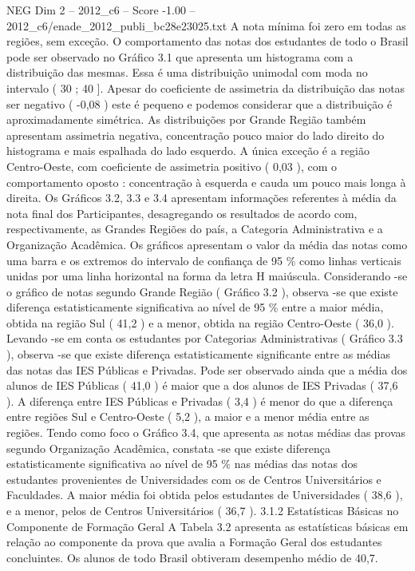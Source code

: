 \begin{textsample}{NEG Dim 2 – 2012\_c6 – Score -1.00 – 2012\_c6/enade\_2012\_publi\_bc28e23025.txt}
A nota mínima foi zero em todas as regiões, sem exceção.
O comportamento das notas dos estudantes de todo o Brasil pode ser observado no Gráfico 3.1 que apresenta um histograma com a distribuição das mesmas.
Essa é uma distribuição unimodal com moda no intervalo ( 30 ; 40 ].
Apesar do coeficiente de assimetria da distribuição das notas ser negativo ( -0,08 ) este é pequeno e podemos considerar que a distribuição é aproximadamente simétrica.
As distribuições por Grande Região também apresentam assimetria negativa, concentração pouco maior do lado direito do histograma e mais espalhada do lado esquerdo.
A única exceção é a região Centro-Oeste, com coeficiente de assimetria positivo ( 0,03 ), com o comportamento oposto : concentração à esquerda e cauda um pouco mais longa à direita.
Os Gráficos 3.2, 3.3 e 3.4 apresentam informações referentes à média da nota final dos Participantes, desagregando os resultados de acordo com, respectivamente, as Grandes Regiões do país, a Categoria Administrativa e a Organização Acadêmica.
Os gráficos apresentam o valor da média das notas como uma barra e os extremos do intervalo de confiança de 95 \% como linhas verticais unidas por uma linha horizontal na forma da letra H maiúscula.
Considerando -se o gráfico de notas segundo Grande Região ( Gráfico 3.2 ), observa -se que existe diferença estatisticamente significativa ao nível de 95 \% entre a maior média, obtida na região Sul ( 41,2 ) e a menor, obtida na região Centro-Oeste ( 36,0 ).
Levando -se em conta os estudantes por Categorias Administrativas ( Gráfico 3.3 ), observa -se que existe diferença estatisticamente significante entre as médias das notas das IES Públicas e Privadas.
Pode ser observado ainda que a média dos alunos de IES Públicas ( 41,0 ) é maior que a dos alunos de IES Privadas ( 37,6 ).
A diferença entre IES Públicas e Privadas ( 3,4 ) é menor do que a diferença entre regiões Sul e Centro-Oeste ( 5,2 ), a maior e a menor média entre as regiões.
Tendo como foco o Gráfico 3.4, que apresenta as notas médias das provas segundo Organização Acadêmica, constata -se que existe diferença estatisticamente significativa ao nível de 95 \% nas médias das notas dos estudantes provenientes de Universidades com os de Centros Universitários e Faculdades.
A maior média foi obtida pelos estudantes de Universidades ( 38,6 ), e a menor, pelos de Centros Universitários ( 36,7 ). 3.1.2 Estatísticas Básicas no Componente de Formação Geral A Tabela 3.2 apresenta as estatísticas básicas em relação ao componente da prova que avalia a Formação Geral dos estudantes concluintes.
Os alunos de todo Brasil obtiveram desempenho médio de 40,7.

\end{textsample}
